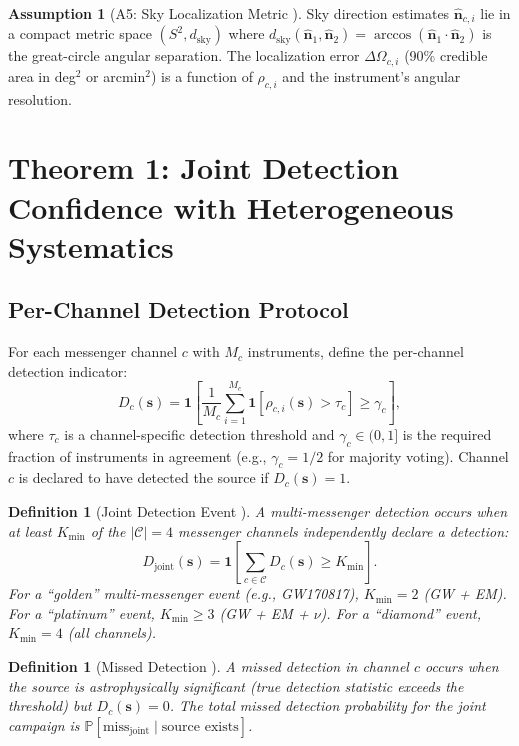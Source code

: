 \documentclass[11pt,a4paper]{article}
\newtheorem{definition}[theorem]{Definition}
\theoremstyle{definition}
\newtheorem{assumption}[theorem]{Assumption}
\newcommand{\Pbb}{\mathbb{P}}
\newcommand{\ind}[1]{\mathbf{1}[#1]}
\begin{document}
\begin{assumption}[A5: Sky Localization Metric ]\label{ass:A5}
Sky direction estimates $\hat{\mathbf{n}}_{c,i}$ lie in a compact metric space $(S^2, d_{\mathrm{sky}})$ where $d_{\mathrm{sky}}(\hat{\mathbf{n}}_1, \hat{\mathbf{n}}_2) = \arccos(\hat{\mathbf{n}}_1 \cdot \hat{\mathbf{n}}_2)$ is the great-circle angular separation. The localization error $\Delta \Omega_{c,i}$ (90\% credible area in deg$^2$ or arcmin$^2$) is a function of $\rho_{c,i}$ and the instrument's angular resolution.
\end{assumption}
\section{Theorem 1: Joint Detection Confidence with Heterogeneous Systematics}
\label{sec:joint_detection}
\subsection{Per-Channel Detection Protocol}
For each messenger channel $c$ with $M_c$ instruments, define the per-channel detection indicator:
\begin{equation}\label{eq:channel_detection}
D_c(\mathbf{s}) = \ind{\frac{1}{M_c}\sum_{i=1}^{M_c} \ind{\rho_{c,i}(\mathbf{s}) > \tau_c} \geq \gamma_c},
\end{equation}
where $\tau_c$ is a channel-specific detection threshold and $\gamma_c \in (0, 1]$ is the required fraction of instruments in agreement (e.g., $\gamma_c = 1/2$ for majority voting). Channel $c$ is declared to have detected the source if $D_c(\mathbf{s}) = 1$.
\begin{definition}[Joint Detection Event ]\label{def:joint_detection}
A multi-messenger detection occurs when at least $K_{\mathrm{min}}$ of the $|\mathcal{C}| = 4$ messenger channels independently declare a detection:
\begin{equation}\label{eq:joint_detection}
D_{\mathrm{joint}}(\mathbf{s}) = \ind{\sum_{c \in \mathcal{C}} D_c(\mathbf{s}) \geq K_{\mathrm{min}}}.
\end{equation}
For a ``golden'' multi-messenger event (e.g., GW170817), $K_{\mathrm{min}} = 2$ (GW + EM). For a ``platinum'' event, $K_{\mathrm{min}} \geq 3$ (GW + EM + $\nu$). For a ``diamond'' event, $K_{\mathrm{min}} = 4$ (all channels).
\end{definition}
\begin{definition}[Missed Detection ]\label{def:missed}
A missed detection in channel $c$ occurs when the source is astrophysically significant (true detection statistic exceeds the threshold) but $D_c(\mathbf{s}) = 0$. The total missed detection probability for the joint campaign is $\Pbb[\text{miss}_{\mathrm{joint}} \mid \text{source exists}]$.
\end{definition}
\end{document}
